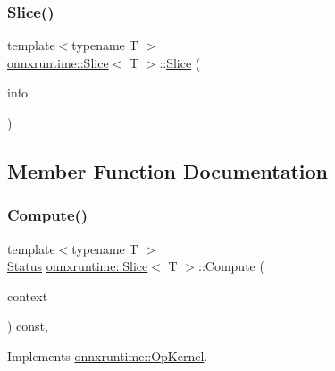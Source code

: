 \subsubsection{\texorpdfstring{Slice()}{Slice()}}
{\footnotesize\ttfamily template$<$typename T $>$ \\
\mbox{\hyperlink{structonnxruntime_1_1Slice}{onnxruntime\+::\+Slice}}$<$ T $>$\+::\mbox{\hyperlink{structonnxruntime_1_1Slice}{Slice}} (\begin{DoxyParamCaption}\item[{const \mbox{\hyperlink{classonnxruntime_1_1OpKernelInfo}{Op\+Kernel\+Info}} \&}]{info }\end{DoxyParamCaption})\hspace{0.3cm}{\ttfamily [inline]}}



\subsection{Member Function Documentation}
\mbox{\label{structonnxruntime_1_1Slice_a44cc8d7c3f69c78672af24126150a2d2}} 
\subsubsection{\texorpdfstring{Compute()}{Compute()}\hspace{0.1cm}{\footnotesize\ttfamily [1/2]}}
{\footnotesize\ttfamily template$<$typename T $>$ \\
\mbox{\hyperlink{classonnxruntime_1_1common_1_1Status}{Status}} \mbox{\hyperlink{structonnxruntime_1_1Slice}{onnxruntime\+::\+Slice}}$<$ T $>$\+::Compute (\begin{DoxyParamCaption}\item[{\mbox{\hyperlink{classonnxruntime_1_1OpKernelContext}{Op\+Kernel\+Context}} $\ast$}]{context }\end{DoxyParamCaption}) const\hspace{0.3cm}{\ttfamily [override]}, {\ttfamily [virtual]}}



Implements \mbox{\hyperlink{classonnxruntime_1_1OpKernel_a9eca8656a78b1b3ab9d3351a12798650}{onnxruntime\+::\+Op\+Kernel}}.

\mbox{\label{structonnxruntime_1_1Slice_a068e219ac9fe41b220bb59b8facd3b24}} 
